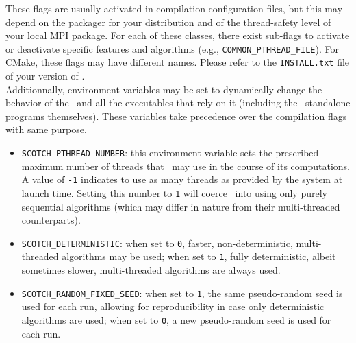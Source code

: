 These flags are usually activated in compilation configuration files,
but this may depend on the packager for your distribution and of the
thread-safety level of your local MPI package. For each of these
classes, there exist sub-flags to activate or deactivate specific
features and algorithms (e.g.,
\texttt{COMMON\_\lbt PTHREAD\_\lbt FILE}). For CMake, these flags may
have different names. Please refer to the
\href{https://gitlab.inria.fr/scotch/scotch/-/blob/master/INSTALL.txt}{\texttt{INSTALL.txt}}
file of your version of \scotch.
\\

Additionnally, environment variables may be set to dynamically
change the behavior of the \libscotch\ and all the executables
that rely on it (including the \scotch\ standalone programs
themselves). These variables take precedence over the compilation
flags with same purpose.
\begin{itemize}
\item
\texttt{SCOTCH\_PTHREAD\_NUMBER}: this environment variable sets the
prescribed maximum number of threads that \scotch\ may use in the
course of its computations. A value of \texttt{-1} indicates to use as
many threads as provided by the system at launch time. Setting this
number to \texttt{1} will coerce \scotch\ into using only purely
sequential algorithms (which may differ in nature from their
multi-threaded counterparts).
\item
\texttt{SCOTCH\_DETERMINISTIC}: when set to \texttt{0}, faster,
non-deterministic, multi-threaded algorithms may be used; when set to
\texttt{1}, fully deterministic, albeit sometimes slower,
multi-threaded algorithms are always used.
\item
\texttt{SCOTCH\_RANDOM\_FIXED\_SEED}: when set to \texttt{1}, the same
pseudo-random seed is used for each run, allowing for reproducibility
in case only deterministic algorithms are used; when set to
\texttt{0}, a new pseudo-random seed is used for each run.
\end{itemize}

\begin{center}
\end{center}

